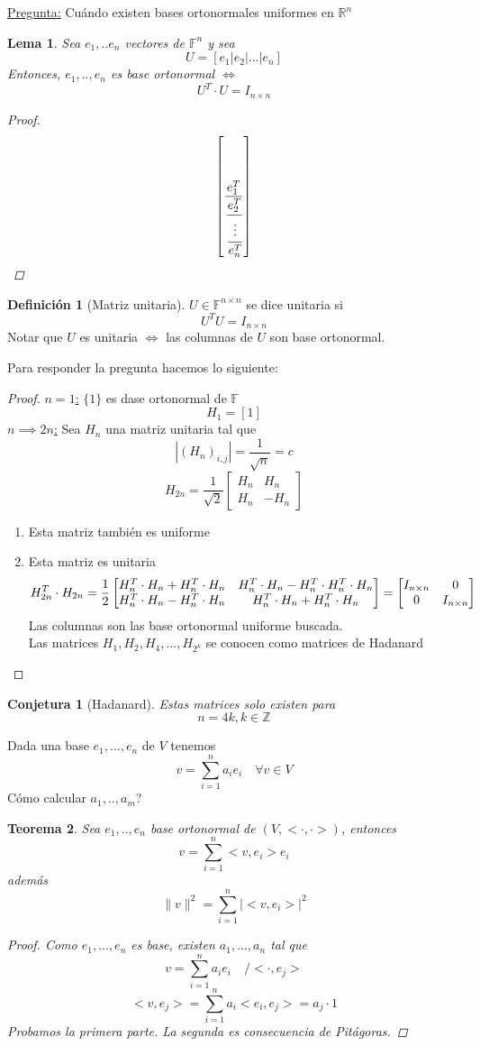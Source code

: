 \documentclass[11pt]{book}
\newcommand{\set}[1]{\mathbb{#1}}
\newtheorem{thm}{Teorema}[section]
\newtheorem{lem}[thm]{Lema}
\newtheorem*{conj}{Conjetura}
\theoremstyle{definition}
\newtheorem{defn}{Definición}[section]
\begin{document}
\underline{Pregunta:} Cuándo existen bases ortonormales uniformes en $\set{R}^n$
\begin{lem}
	Sea $e_1,..e_n$ vectores de $\set{F}^n$ y sea
	\[U=\left[e_1|e_2|...|e_n\right]\]
	Entonces, $e_1,..,e_n$ es base ortonormal $\iff$
	\[U^T\cdot U=I_{n\times n}\]
	\begin{proof}
		\[\left[\frac{e_1^T}{\cfrac{e_2^T}{\cfrac{\vdots}{e_n^T}}}\right]\]
	\end{proof}
\end{lem}
\begin{defn}[Matriz unitaria]
	$U\in\set{F}^{n\times n}$ se dice unitaria si
	\[U^TU=I_{n\times n}\]
	Notar que $U$ es unitaria $\iff$ las columnas de $U$ son base ortonormal.
\end{defn}
Para responder la pregunta hacemos lo siguiente:
\begin{proof}
	\underline{$n=1$:} $\{1\}$ es dase ortonormal de $\set{F}$
	\[H_1=[1]\]
	\underline{$n\implies 2n$:} Sea $H_n$ una matriz unitaria tal que
	\[|(H_n)_{i,j}|=\frac{1}{\sqrt{n}}=c\]
	\[H_{2n}=\frac{1}{\sqrt{2}}\begin{bmatrix}
			H_n & H_n  \\
			H_n & -H_n
		\end{bmatrix}\]
	\begin{enumerate}
		\item Esta matriz también es uniforme

		\item Esta matriz es unitaria
		      \[H_{2n}^T\cdot H_{2n}=\frac{1}{2}\begin{bmatrix}
				      H_n^T\cdot H_n+H_n^T\cdot H_n & H_n^T\cdot H_n-H_n^T\cdot H_n^T\cdot H_n \\
				      H_n^T\cdot H_n-H_n^T\cdot H_n & H_n^T\cdot H_n+H_n^T\cdot H_n
			      \end{bmatrix}=\begin{bmatrix}
				      I_{n\times n} & 0             \\
				      0             & I_{n\times n}
			      \end{bmatrix}\qedhere\]
		      Las columnas son las base ortonormal uniforme buscada.\\
		      Las matrices $H_1,H_2,H_4,...,H_{2^k}$ se conocen como matrices de Hadanard
	\end{enumerate}
\end{proof}
\begin{conj}[Hadanard]
	Estas matrices solo existen para
	\[n=4k,k\in\set{Z}\]
\end{conj}
Dada una base $e_1,...,e_n$ de $V$ tenemos
\[v=\sum^n_{i=1}a_ie_i\quad \forall v\in V\]
Cómo calcular $a_1,..,a_m$?
\begin{thm}
	Sea $e_1,..,e_n$ base ortonormal de $(V,<\cdot,\cdot>)$, entonces
	\[v=\sum^n_{i=1}<v,e_i>e_i\]
	además
	\[\|v\|^2=\sum^n_{i=1}|<v,e_i>|^2\]
	\begin{proof}
		Como $e_1,...,e_n$ es base, existen $a_1,...,a_n$ tal que\[v=\sum^n_{i=1}a_ie_i\quad /<\cdot,e_j>\]
		\[<v,e_j>=\sum^n_{i=1}a_i<e_i,e_j>=a_j\cdot 1\]
		Probamos la primera parte. La segunda es consecuencia de Pitágoras.
	\end{proof}
\end{thm}
\end{document}
